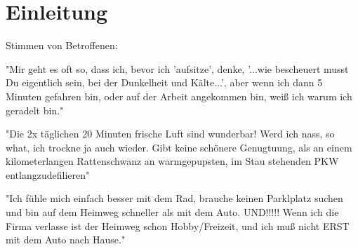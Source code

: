 \chapter{Einleitung}


Stimmen von Betroffenen:

"Mir geht es oft so, dass ich, bevor ich 'aufsitze', denke,
'...wie bescheuert musst Du eigentlich sein, bei der Dunkelheit und Kälte...',
aber wenn ich dann 5 Minuten gefahren bin, oder auf der Arbeit angekommen bin,
weiß ich warum ich geradelt bin."
\cite{iglimann2011rennradnews}

"Die 2x täglichen 20 Minuten frische Luft sind wunderbar!
Werd ich nass, so what, ich trockne ja auch wieder.
Gibt keine schönere Genugtuung, als an einem kilometerlangen Rattenschwanz an warmgepupsten, im Stau stehenden PKW entlangzudefilieren"
\cite{efix2011rennradnews}


"Ich fühle mich einfach besser mit dem Rad, brauche keinen Parklplatz suchen und bin auf dem Heimweg schneller als mit dem Auto.
UND!!!!! Wenn ich die Firma verlasse ist der Heimweg schon Hobby/Freizeit,
und ich muß nicht ERST mit dem Auto nach Hause."
\cite{littlechex2011rennradnews}




